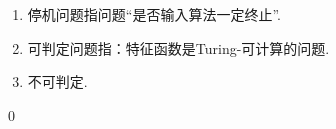 \begin{pf} \rm \;
    \begin{enumerate}
        \item 停机问题指问题“是否输入算法一定终止”.
        \item 可判定问题指：特征函数是Turing-可计算的问题.
        \item 不可判定.
    \end{enumerate}
    \qed
\end{pf}
